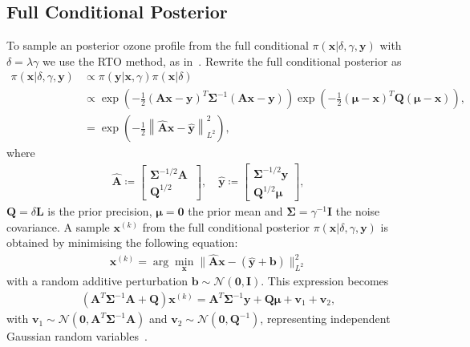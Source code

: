 \documentclass{article}
\begin{document}
\subsection{Full Conditional Posterior}
\label{subsec:FullCondPost}
To sample an posterior ozone profile from the full conditional $\pi(\bm{x} | \delta, \gamma, \bm{y})$ with $\delta = \lambda \gamma$ we use the RTO method, as in~\cite{bardsley2012mcmc, bardsley2014randomize,BardsleyTC2019RTO,fox2016fast}.
Rewrite the full conditional posterior as
\begin{align}
	\pi(\bm{x} |  \delta, \gamma, \bm{y}) & \propto \pi(\bm{y}|\bm{x}, \gamma) \pi(\bm{x}| \delta)\\
	&\propto \exp \left(-\frac{1}{2} (\bm{A} \bm{x} - \bm{y})^T \bm{\Sigma}^{-1} (\bm{A}  \bm{x} - \bm{y})\right) \exp \left(-\frac{1}{2} (\bm{\mu} - \bm{x} )^T \bm{Q}(\bm{\mu} - \bm{x} ) \right),\\
	& = \exp \left( - \frac{1}{2}\left\lVert \hat{\bm{A}} \bm{x} - \hat{\bm{y}} \right\rVert_{L^2}^2 \right),
\end{align}
where
\begin{align}
	\label{eq:minimizer}
	\hat{\bm{A}} \coloneqq 
	\begin{bmatrix}
		\bm{\Sigma}^{-1/2} \bm{A} \ \\
		\bm{Q}^{1/2}
	\end{bmatrix}, \quad 
	\hat{\bm{y}} \coloneqq 
	\begin{bmatrix}
		\bm{\Sigma}^{-1/2} \bm{y} \\
		\bm{Q}^{1/2} \bm{\mu}
	\end{bmatrix} , 
\end{align}
$\bm{Q} = \delta \bm{L}$ is the prior precision, $\bm{\mu} = \bm{0}$ the prior mean and $\bm{\Sigma}= \gamma^{-1} \bm{I}$ the noise covariance.
A sample $\bm{x}^{(k)}$ from the full conditional posterior $ \pi(\bm{x}|   \delta, \gamma,  \bm{y})$ is obtained by minimising the following equation:
\begin{align}
	\bm{x}^{(k)} = \arg \min_{\bm{x}} \lVert \hat{\bm{A}} \bm{x} - ( \hat{\bm{y}} + \bm{b} ) \rVert_{L^2}^2 
\end{align}
with a random additive perturbation $\bm{b} \sim \mathcal{N}(\bm{0}, \bm{I})$.
This expression becomes
\begin{align}
	\label{eq:RTO}
	\left( \bm{A}^T \bm{\Sigma}^{-1} \bm{A} + \bm{Q} \right) \bm{x}^{(k)} = \bm{A}^T \bm{\Sigma}^{-1} \bm{y} + \bm{Q} \bm{\mu} + \bm{v}_1 + \bm{v}_2,
\end{align}
with $\bm{v}_1 \sim \mathcal{N}(\bm{0}, \bm{A}^T \bm{\Sigma}^{-1} \bm{A})$ and $\bm{v}_2 \sim \mathcal{N}(\bm{0}, \bm{Q}^{-1})$, representing independent Gaussian random variables~\cite{bardsley2012mcmc, fox2016fast}.
\end{document}
